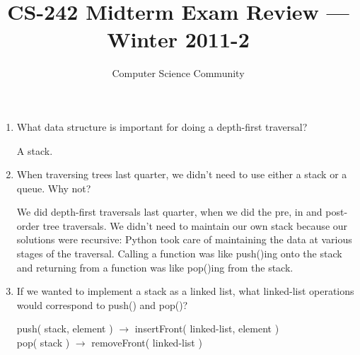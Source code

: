 \documentclass[11pt]{article}
\author{Computer Science Community}
\title{CS-242 Midterm Exam Review \---- Winter 2011-2}
\newenvironment{answer}{\large\lstset{basicstyle=\large}\color{white}}{}
\newenvironment{answer}{\large\lstset{basicstyle=\large}\color{red}}{}
\begin{document}

\begin{enumerate}
\section*{Stacks and Queues}
    \item What data structure is important for doing a depth-first traversal?

        \begin{answer}
        A stack.
        \end{answer}

    \item When traversing trees last quarter, we didn't need to use either a
        stack or a queue. Why not?

        \begin{answer}
        We did depth-first traversals last quarter, when we did the pre, in and
        post-order tree traversals. We didn't need to maintain our own stack
        because our solutions were recursive: Python took care of maintaining
        the data at various stages of the traversal. Calling a function was
        like push()ing onto the stack and returning from a function was like
        pop()ing from the stack.
        \end{answer}

    \item If we wanted to implement a stack as a linked list, what linked-list
        operations would correspond to push() and pop()?

        \begin{answer}
        push( stack, element ) $\rightarrow$ insertFront( linked-list, element )\\
        pop( stack ) $\rightarrow$ removeFront( linked-list )
        \end{answer}
        

\end{enumerate}
\end{document}

